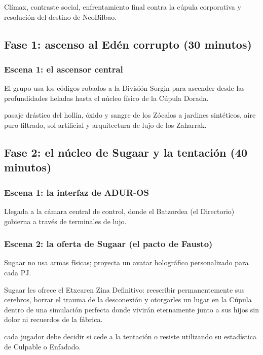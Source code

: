 
 Clímax, contraste social, enfrentamiento final contra la cúpula corporativa y resolución del destino de NeoBilbao.

\subsection{Fase 1: ascenso al Edén corrupto (30 minutos)}

\subsubsection{Escena 1: el ascensor central}
El grupo usa los códigos robados a la División Sorgin para ascender desde las profundidades heladas hasta el núcleo físico de la Cúpula Dorada.\par
{} pasaje drástico del hollín, óxido y sangre de los Zócalos a jardines sintéticos, aire puro filtrado, sol artificial y arquitectura de lujo de los Zaharrak.

\subsection{Fase 2: el núcleo de Sugaar y la tentación (40 minutos)}

\subsubsection{Escena 1: la interfaz de ADUR-OS}
Llegada a la cámara central de control, donde el Batzordea (el Directorio) gobierna a través de terminales de lujo.

\subsubsection{Escena 2: la oferta de Sugaar (el pacto de Fausto)}
Sugaar no usa armas físicas; proyecta un avatar holográfico personalizado para cada PJ.\par
{} Sugaar les ofrece el Etxearen Zina Definitivo: reescribir permanentemente sus cerebros, borrar el trauma de la desconexión y otorgarles un lugar en la Cúpula dentro de una simulación perfecta donde vivirán eternamente junto a sus hijos sin dolor ni recuerdos de la fábrica.\par
{} cada jugador debe decidir si cede a la tentación o resiste utilizando su estadística de Culpable o Enfadado.

